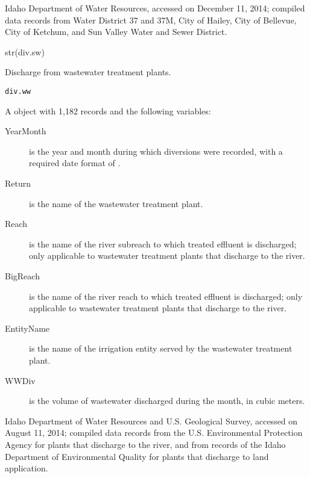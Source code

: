\documentclass[a4paper]{book}
\begin{document}
%
\begin{Source}\relax
Idaho Department of Water Resources, accessed on December 11, 2014;
compiled data records from Water District 37 and 37M, City of Hailey, City of Bellevue, City of Ketchum, and Sun Valley Water and Sewer District.
\end{Source}
%
\begin{Examples}
\begin{ExampleCode}
str(div.sw)
\end{ExampleCode}
\end{Examples}
%
\begin{Description}\relax
Discharge from wastewater treatment plants.
\end{Description}
%
\begin{Usage}
\begin{verbatim}
div.ww
\end{verbatim}
\end{Usage}
%
\begin{Format}
A  object with 1,182 records and the following variables:
\begin{description}

\item[YearMonth] is the year and month during which diversions were recorded, with a required date format of .
\item[Return] is the name of the wastewater treatment plant.
\item[Reach] is the name of the river subreach to which treated effluent is discharged; only applicable to wastewater treatment plants that discharge to the river.
\item[BigReach] is the name of the river reach to which treated effluent is discharged; only applicable to wastewater treatment plants that discharge to the river.
\item[EntityName] is the name of the irrigation entity served by the wastewater treatment plant.
\item[WWDiv] is the volume of wastewater discharged during the month, in cubic meters.

\end{description}

\end{Format}
%
\begin{Source}\relax
Idaho Department of Water Resources and U.S. Geological Survey, accessed on August 11, 2014;
compiled data records from the U.S. Environmental Protection Agency for plants that discharge to the river, and from records of the Idaho Department of Environmental Quality for plants that discharge to land application.
\end{Source}
\end{document}
